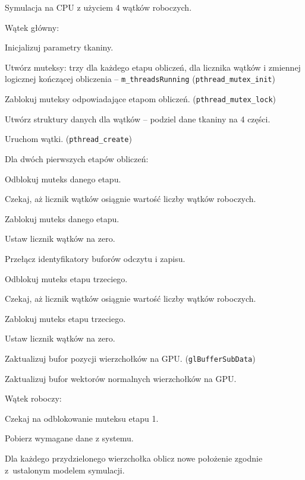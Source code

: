 		\begin{algorithm}[H]
			\label{alg_5_3}
			\caption{Symulacja na CPU z użyciem 4 wątków roboczych.}	
			Wątek główny:
			
			\Indp
			
			Inicjalizuj parametry tkaniny.
			
			Utwórz muteksy: trzy dla każdego etapu obliczeń, dla licznika wątków i zmiennej logicznej kończącej obliczenia -- \texttt{m\_threadsRunning} (\texttt{pthread\_mutex\_init})
			
			Zablokuj muteksy odpowiadające etapom obliczeń. (\texttt{pthread\_mutex\_lock})
			
			Utwórz struktury danych dla wątków -- podziel dane tkaniny na 4 części.
			
			Uruchom wątki. (\texttt{pthread\_create})
			
			{
				Dla dwóch pierwszych etapów obliczeń:
				
				\Indp
					Odblokuj muteks danego etapu.
					
					Czekaj, aż licznik wątków osiągnie wartość liczby wątków roboczych.
					
					Zablokuj muteks danego etapu.
					
					Ustaw licznik wątków na zero.
					
					Przełącz identyfikatory buforów odczytu i zapisu.
				\Indm
				
				Odblokuj muteks etapu trzeciego.
				
				Czekaj, aż licznik wątków osiągnie wartość liczby wątków roboczych.
				
				Zablokuj muteks etapu trzeciego.
				
				Ustaw licznik wątków na zero.
				
				Zaktualizuj bufor pozycji wierzchołków na GPU. (\texttt{glBufferSubData})
				
				Zaktualizuj bufor wektorów normalnych wierzchołków na GPU.
			}
			
			\Indm
			
			Wątek roboczy:
			
			\Indp
			
			{
				Czekaj na odblokowanie muteksu etapu 1.
				
				Pobierz wymagane dane z systemu.
				
				Dla każdego przydzielonego wierzchołka oblicz nowe położenie zgodnie z~ustalonym modelem symulacji.
				
}
\end{algorithm}
